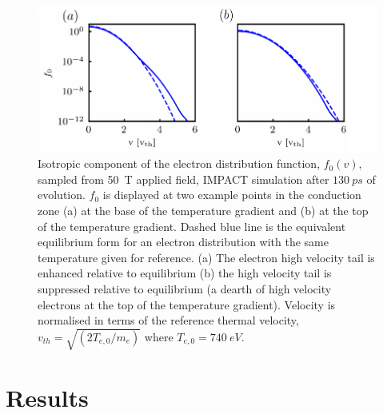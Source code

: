\documentclass[aip,reprint]{revtex4-1}
\begin{document}
\begin{figure}
	\includegraphics[width=1.0\columnwidth]{pics/f0_50T_LT1_noTe.pdf}%
	\caption{\label{fig:f0prof} Isotropic component of the electron distribution function, $f_0(v)$, sampled from \SI{50}{T} applied field, IMPACT simulation after $\SI{130}{ps}$ of evolution. $f_0$ is displayed at two example points in the conduction zone  (a) at the base of the temperature gradient and (b) at the top of the temperature gradient. Dashed blue line is the equivalent equilibrium form for an electron distribution with the same temperature given for reference. (a) The electron high velocity tail is enhanced relative to equilibrium (b) the high velocity tail is suppressed relative to equilibrium (a dearth of high velocity electrons at the top of the temperature gradient).   Velocity is normalised in terms of the reference thermal velocity, $v_{th}= \sqrt{(2 T_{e,0}/m_e)}$ where $T_{e,0}= \SI{740}{eV}$.} %
\end{figure}


\section{Results}
\end{document}
